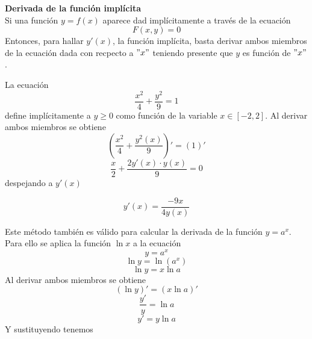 \documentclass[10pt,twoside]{SelfArx} %
\begin{document}
\textbf{Derivada de la función implícita}\\
Si una función $ y=f(x) $ aparece dad impl\'icitamente  a trav\'es de la ecuación 
\[ F(x,y)=0 \]
Entonces, para hallar $ y'(x) $, la funci\'on implícita, basta derivar ambos miembros de la ecuación dada con recpecto a $ "x" $ teniendo presente que  $ y $ es función de $ "x" $.
\begin{ejemplo}
	La ecuación 
	\[ \dfrac{x^{2}}{4}+\dfrac{y^{2}}{9}=1 \]
	define implícitamente a $ y\geq0 $ como función de la variable $ x\in [-2,2] $. Al derivar ambos miembros se obtiene
	\begin{equation}
\left 	(\dfrac{x^{2}}{4}+\dfrac{y^{2}(x)}{9}\right )'=(1)'
	\end{equation}
	\begin{equation}
	\dfrac{x}{2}+\dfrac{2y'(x)\cdot y(x)}{9}=0
	\end{equation}
	despejando a $ y'(x) $

		\begin{equation}
		y'(x)=\dfrac{-9x}{4y(x)}
		\end{equation}
		
\end{ejemplo}
Este método también es válido para calcular la derivada de la función $ y=a^{x} $.\\
Para ello se aplica la función $ \ln x $ a la ecuación 
\begin{equation}
y=a^{x}
\end{equation}
\begin{equation}
\ln y=\ln(a^{x})
\end{equation}
\begin{equation}
\ln y=x\ln a
\end{equation}
Al derivar ambos miembros  se obtiene 
\begin{equation}
(\ln y)'=(x\ln a)'
\end{equation}
\begin{equation}
\dfrac{y'}{y}=\ln a
\end{equation}
\begin{equation}
y'=y\ln a
\end{equation}
Y sustituyendo tenemos\\
\end{document}
